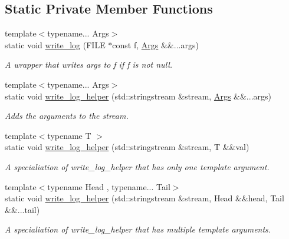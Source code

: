 \subsection*{Static Private Member Functions}
\begin{DoxyCompactItemize}
\item 
{\footnotesize template$<$typename... Args$>$ }\\static void \hyperlink{class_utilities_a7085b246ac1d31d8d3ac16663e6718d9}{write\+\_\+log} (F\+I\+LE $\ast$const f, \hyperlink{struct_args}{Args} \&\&...args)
\begin{DoxyCompactList}\small\item\em A wrapper that writes args to f if f is not null. \end{DoxyCompactList}\item 
{\footnotesize template$<$typename... Args$>$ }\\static void \hyperlink{class_utilities_a0763f59c16f6eb83b9c0e8abe014287a}{write\+\_\+log\+\_\+helper} (std\+::stringstream \&stream, \hyperlink{struct_args}{Args} \&\&...args)
\begin{DoxyCompactList}\small\item\em Adds the arguments to the stream. \end{DoxyCompactList}\item 
{\footnotesize template$<$typename T $>$ }\\static void \hyperlink{class_utilities_ae816a2f7a656a433f6204687bff59a6c}{write\+\_\+log\+\_\+helper} (std\+::stringstream \&stream, T \&\&val)
\begin{DoxyCompactList}\small\item\em A specialiation of write\+\_\+log\+\_\+helper that has only one template argument. \end{DoxyCompactList}\item 
{\footnotesize template$<$typename Head , typename... Tail$>$ }\\static void \hyperlink{class_utilities_a6b7a8d8b77768fde23f66d4f7a57c1c6}{write\+\_\+log\+\_\+helper} (std\+::stringstream \&stream, Head \&\&head, Tail \&\&...tail)
\begin{DoxyCompactList}\small\item\em A specialiation of write\+\_\+log\+\_\+helper that has multiple template arguments. \end{DoxyCompactList}\end{DoxyCompactItemize}
